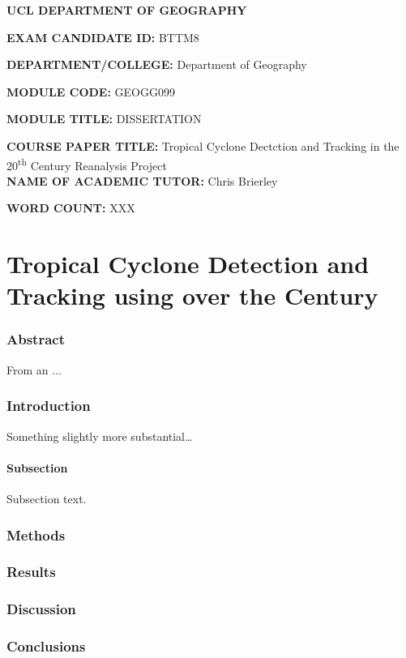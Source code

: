 \documentclass{article}
\newcommand{\ts}{\textsuperscript}
\begin{document}
\textbf{UCL DEPARTMENT OF GEOGRAPHY}\\[4cm]

\LARGE

\textbf{EXAM CANDIDATE ID:} BTTM8

\textbf{DEPARTMENT/COLLEGE:} Department of Geography

\textbf{MODULE CODE:} GEOGG099

\textbf{MODULE TITLE:} DISSERTATION

\textbf{COURSE PAPER TITLE:} Tropical Cyclone Dectction and Tracking in the 20\ts{th} Century Reanalysis Project \\[3cm]

\textbf{NAME OF ACADEMIC TUTOR:} Chris Brierley

\textbf{WORD COUNT:} XXX

\normalsize

\newpage


\part*{Tropical Cyclone Detection and Tracking using over the  Century}

\section*{Abstract}

From an ...

\section{Introduction}

Something slightly more substantial\dots

\subsection{Subsection}

Subsection text.


\section{Methods}


\newpage
\section{Results}






\section{Discussion}


\section{Conclusions}



\end{document}
